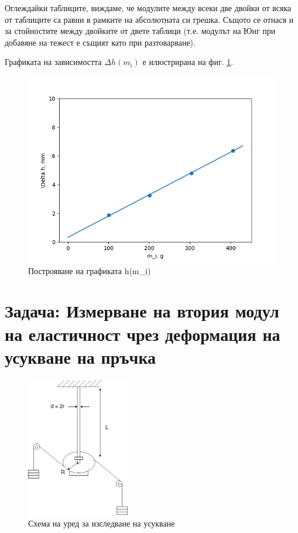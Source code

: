 \documentclass[12pt]{article}
\begin{document}
Оглеждайки таблиците, виждаме, че модулите между всеки две двойки от всяка от таблиците са равни в рамките на абсолютната си грешка. Същото се отнася и за стойностите между двойките от двете таблици (т.е. модулът на Юнг при добавяне на тежест е същият като при разтоварване).


Графиката на зависимостта $\Delta h(m_i)$ е илюстрирана на фиг. \ref{fig:dataanal}.

\begin{figure}
    \centering
    \includegraphics[width=1\textwidth]{images/dataanal.png}
    \caption{Построяване на графиката \Delta h(m_i)}
    \label{fig:dataanal}
\end{figure}


\section{Задача: Измерване на втория модул на еластичност чрез деформация на усукване на пръчка}


\begin{figure}
    \centering
    \includegraphics[width=0.4\textwidth]{images/young-twisting.drawio.png}
    \caption{Схема на уред за изследване на усукване}
    \label{fig:setup-twisting}
\end{figure}
\end{document}
